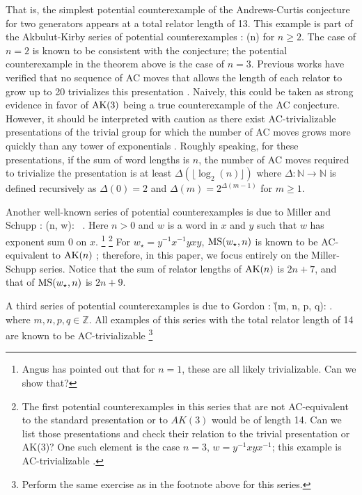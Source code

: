 That is, the simplest potential counterexample of the Andrews-Curtis conjecture for two generators
appears at a total relator length of 13.
This example is part of the Akbulut-Kirby series of potential counterexamples \cite{Akbulut-Kirby}:
\bea
\AK(n) \colon {}
\eea
for $n \geq 2.$ The case of $n=2$ is known to be consistent with the conjecture; the potential counterexample
in the theorem above is the case of $n=3$.
Previous works have verified that no sequence of AC moves that allows the length of each relator to grow up to 20 trivializes this presentation \cite{Panteleev-Ushakov}.
Naively, this could be taken as strong evidence in favor of $\text{AK}(3)$ being a true counterexample of the AC conjecture.
However, it should be interpreted with caution as there exist AC-trivializable presentations of the trivial group for which the number of AC moves grows more quickly than any tower of exponentials \cite{Bridson, Lishak}.
Roughly speaking, for these presentations, if the sum of word lengths is $n$, the number of AC moves required to trivialize the presentation is at least $\Delta (\lfloor \log_2 (n) \rfloor)$ where $\Delta \colon \mathbb{N} \to \mathbb{N}$ is defined recursively as $\Delta(0) = 2$ and $\Delta (m) = 2^{\Delta(m-1)}$ for $m \geq 1$.
\newline

Another well-known series of potential counterexamples is due to Miller and Schupp \cite{Miller-Schupp}:
\bea
\MS(n, w): \ .
\eea
Here $n > 0$ and $w$ is a word in $x$ and $y$ such that $w$ has exponent sum 0
on $x$.
\footnote{Angus has pointed out that for $n=1$, these are all likely trivializable.
Can we show that?
	 }
\footnote{The first potential counterexamples in this series that are not AC-equivalent to the standard presentation or to $AK(3)$ would be of length 14.
Can we list those presentations and	check their relation to the trivial presentation or AK(3)? One such element is the case $n=3$, $w = y^{-1} x y x^{-1}$; this example is AC-trivializable \cite{morse}.}
For $w_\star = y^{-1} x^{-1} y x y$, $\text{MS}(w_\star, n)$ is known to be AC-equivalent to $\text{AK}(n)$ \cite{MMS}; therefore, in this paper, we focus entirely on the Miller-Schupp series.
Notice that the sum of relator lengths of $\text{AK}(n)$ is $2n+7$, and that of $\text{MS}(w_\star, n)$ is $2n+9$.
\newline

A third series of potential counterexamples is due to Gordon \cite{Brown}:
\bea
\G(m, n, p, q): .
\eea
where $m,n,p,q \in \mathbb{Z}$.
All examples of this series with the total relator length of 14 are known
to be AC-trivializable \cite{Bowman-McCaul}
\footnote{Perform the same exercise as in the footnote above for this series.}
\newline

